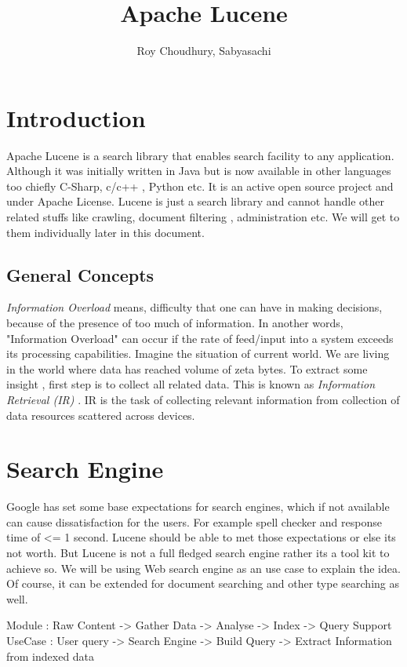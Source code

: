 \documentclass[9pt,twocolumn,twoside]{../../styles/osajnl}
\title{Apache Lucene}
\author[1,*, +]{Roy Choudhury, Sabyasachi}
\affil[1]{School of Informatics and Computing, Bloomington, IN 47408, U.S.A.}
\affil[*]{Corresponding authors: sabyroyc@indiana.edu}
\affil[+]{HID - S17-IO-3015}
\begin{document}
\maketitle

\section{Introduction}

Apache Lucene is a search library that enables search facility to any 
application. Although it was initially written in Java but is now available
in other languages too chiefly C-Sharp, c/c++ , Python etc. It is an active
open source project and under Apache License. Lucene is just a search library 
and cannot handle other related stuffs like crawling, document filtering , 
administration etc. We will get to them individually later in this document.

\subsection{General Concepts}
\emph{Information Overload}  means, difficulty that one can have in making decisions, because of the presence of too much of information. In another words, "Information Overload" can occur if the rate of feed/input into a system exceeds its processing capabilities. Imagine the situation of current world. We are living in the world where data has reached volume of zeta bytes. To extract some insight , first step is to collect all related data. This is known as \emph{Information Retrieval (IR)} \cite{wiki-ir}. IR is the task of collecting relevant information from collection of data resources scattered across devices. 

\section{Search Engine}
Google has set some base expectations for search engines, which if not available can cause dissatisfaction for the users. For example spell checker and response time of <= 1 second. Lucene should be able to met those expectations or else its not worth. But Lucene is not a full fledged search engine rather its a tool kit to achieve so. We will be using Web search engine as an use case to explain the idea. Of course, it can be extended for document searching and other type searching as well.

Module  : Raw Content -> Gather Data -> Analyse -> Index ->  Query Support 
UseCase : User query -> Search Engine -> Build Query -> Extract Information from indexed data
\end{document}
